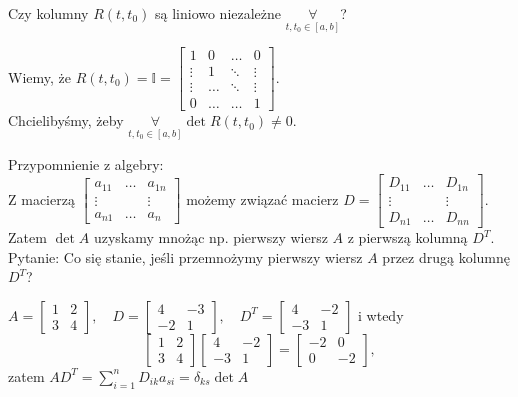 \documentclass[../main.tex]{subfiles}
\begin{document}
\begin{pytanie}
Czy kolumny $R(t,t_0)$ są liniowo niezależne $\underset{t,t_0\in [a,b]}{\forall} $?
\end{pytanie}
Wiemy, że $R(t,t_0) = \mathbb{I} = \begin{bmatrix} 1&0&\ldots&0\\ \vdots&1&\ddots&\vdots \\ \vdots&\dots&\ddots&\vdots \\ 0&\dots&\dots&1 \end{bmatrix} $.\\
Chcielibyśmy, żeby $\underset{t,t_0\in[a,b] }{\forall} \det R(t,t_0) \neq 0$.

Przypomnienie z algebry:\\
Z macierzą $\begin{bmatrix} a_{11}&\ldots&a_{1n}\\ \vdots & & \vdots \\a_{n1} &\dots& a_{n} \end{bmatrix} $ możemy związać macierz $D = \begin{bmatrix} D_{11}&\ldots&D_{1n}\\ \vdots &&\vdots \\ D_{n1} & \ldots & D_{nn} \end{bmatrix} $.\\
Zatem $\det A$ uzyskamy mnożąc np. pierwszy wiersz $A$ z pierwszą kolumną $D^T$.\\
Pytanie: Co się stanie, jeśli przemnożymy pierwszy wiersz $A$ przez drugą kolumnę $D^T$?
\begin{przyklad}
    $A = \begin{bmatrix} 1&2\\3&4 \end{bmatrix},\quad D = \begin{bmatrix} 4&-3\\ -2&1 \end{bmatrix},\quad D^T = \begin{bmatrix} 4&-2\\-3&1 \end{bmatrix} $ i wtedy
        \[
            \begin{bmatrix} 1&2\\3&4 \end{bmatrix} \begin{bmatrix} 4&-2\\-3&1 \end{bmatrix} = \begin{bmatrix} -2&0\\0&-2 \end{bmatrix}
    ,\]
            zatem $AD^T = \sum_{i=1}^n D_{ik}a_{si} = \delta_{ks}\det A$
\end{przyklad}
\end{document}

